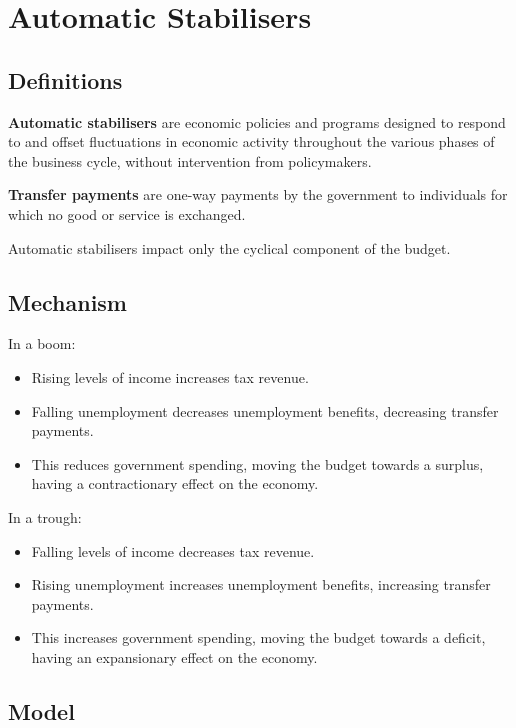 \documentclass[a4paper,11pt]{report}
\begin{document}
\section{Automatic Stabilisers}

\subsection{Definitions}

\textbf{Automatic stabilisers} are economic policies and programs designed to
respond to and offset fluctuations in economic activity throughout the various
phases of the business cycle, without intervention from policymakers.

\textbf{Transfer payments} are one-way payments by the government to individuals
for which no good or service is exchanged.

Automatic stabilisers impact only the cyclical component of the budget.

\subsection{Mechanism}

In a boom:

\begin{itemize}
\item Rising levels of income increases tax revenue.
\item Falling unemployment decreases unemployment benefits, decreasing transfer
	payments.
\item This reduces government spending, moving the budget towards a surplus,
	having a contractionary effect on the economy.
\end{itemize}

In a trough:

\begin{itemize}
\item Falling levels of income decreases tax revenue.
\item Rising unemployment increases unemployment benefits, increasing transfer
	payments.
\item This increases government spending, moving the budget towards a deficit,
	having an expansionary effect on the economy.
\end{itemize}

\subsection{Model}
\end{document}
